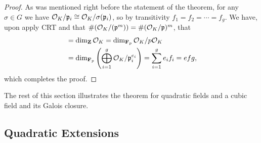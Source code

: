 \begin{proof}
As was mentioned right before the statement of the theorem,  for any $\sigma\in G$
we have $\mathcal{O}_K/\mathfrak{p}_i\cong \mathcal{O}_K/\sigma(\mathfrak{p}_i)$, so by transitivity $f_1=f_2=\cdots = f_g$.
We have, upon apply CRT and that $\#(\mathcal{O}_K/(\mathfrak{p}^m)) = \#(\mathcal{O}_K/\mathfrak{p})^m$, that
\begin{align*}
[K:\Q]&= \dim_{\Z} \O_K = \dim_{\F_p} \O_K/p\O_K\\
    &= \dim_{\F_p} \left(\bigoplus_{i=1}^g \O_K/\p_i^{e_i}\right) 
    = \sum_{i=1}^g e_i f_i
    = efg,
\end{align*}
which completes the proof.
\end{proof}

The rest of this section illustrates the theorem for quadratic fields
and a cubic field and its Galois closure.
\subsection{Quadratic Extensions}

